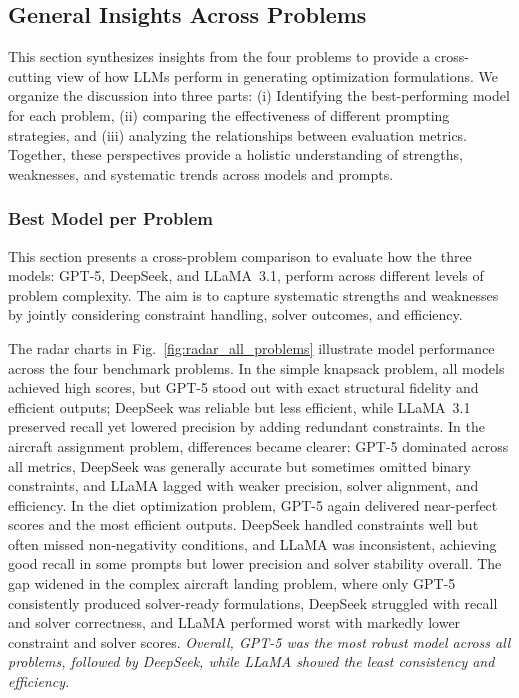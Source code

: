 \documentclass[review,12pt]{elsarticle}
\begin{document}
\subsection{General Insights Across Problems}
This section synthesizes insights from the four problems to provide a cross-cutting view of how LLMs perform in generating optimization formulations. We organize the discussion into three parts: (i) Identifying the best-performing model for each problem, (ii) comparing the effectiveness of different prompting strategies, and (iii) analyzing the relationships between evaluation metrics. Together, these perspectives provide a holistic understanding of strengths, weaknesses, and systematic trends across models and prompts.




\subsubsection{Best Model per Problem}
This section presents a cross-problem comparison to evaluate how the three models: GPT-5, DeepSeek, and LLaMA~3.1, perform across different levels of problem complexity. The aim is to capture systematic strengths and weaknesses by jointly considering constraint handling, solver outcomes, and efficiency. 

The radar charts in Fig.~\ref{fig:radar_all_problems} illustrate model performance across the four benchmark problems. In the simple knapsack problem, all models achieved high scores, but GPT-5 stood out with exact structural fidelity and efficient outputs; DeepSeek was reliable but less efficient, while LLaMA~3.1 preserved recall yet lowered precision by adding redundant constraints. In the aircraft assignment problem, differences became clearer: GPT-5 dominated across all metrics, DeepSeek was generally accurate but sometimes omitted binary constraints, and LLaMA lagged with weaker precision, solver alignment, and efficiency. In the diet optimization problem, GPT-5 again delivered near-perfect scores and the most efficient outputs. DeepSeek handled constraints well but often missed non-negativity conditions, and LLaMA was inconsistent, achieving good recall in some prompts but lower precision and solver stability overall. The gap widened in the complex aircraft landing problem, where only GPT-5 consistently produced solver-ready formulations, DeepSeek struggled with recall and solver correctness, and LLaMA performed worst with markedly lower constraint and solver scores. \textit{Overall, GPT-5 was the most robust model across all problems, followed by DeepSeek, while LLaMA showed the least consistency and efficiency.}
\end{document}

